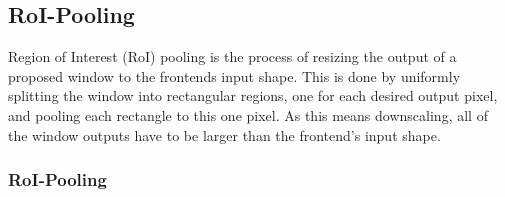 \subsection{RoI-Pooling}
Region of Interest (RoI) pooling is the process of
resizing the output of a proposed window to the frontends input
shape.
This is done by uniformly splitting the window into rectangular
regions, one for each desired output pixel, and pooling each
rectangle to this one pixel. As this means downscaling, all of the
window outputs have to be larger than the frontend's input shape.
\begin{frame}
  \frametitle<presentation>{RoI-Pooling}
  \begin{figure}
\end{figure}
\end{frame}
